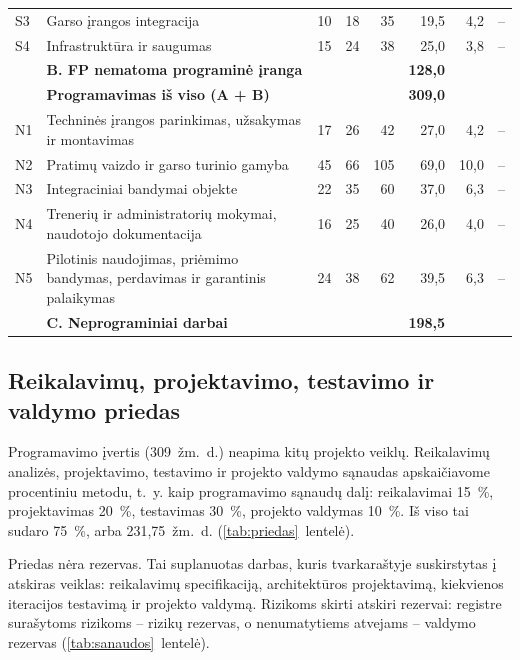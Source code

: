 \begin{table}[H]
\begin{tabularx}{\textwidth}{@{}l>{\raggedright\arraybackslash}Xrrrrrr@{}}
    S3 & Garso įrangos integracija & 10 & 18 & 35 & 19,5 & 4,2 & -- \\
    S4 & Infrastruktūra ir saugumas & 15 & 24 & 38 & 25,0 & 3,8 & -- \\
    \midrule
    & \textbf{B. FP nematoma programinė įranga} & & & & \textbf{128,0} & & \\
    & \textbf{Programavimas iš viso (A + B)} & & & & \textbf{309,0} & & \\
    \midrule
    N1 & Techninės įrangos parinkimas, užsakymas ir montavimas & 17 & 26 & 42 & 27,0 & 4,2 & -- \\
    N2 & Pratimų vaizdo ir garso turinio gamyba & 45 & 66 & 105 & 69,0 & 10,0 & -- \\
    N3 & Integraciniai bandymai objekte & 22 & 35 & 60 & 37,0 & 6,3 & -- \\
    N4 & Trenerių ir administratorių mokymai, naudotojo dokumentacija & 16 & 25 & 40 & 26,0 & 4,0 & -- \\
    N5 & Pilotinis naudojimas, priėmimo bandymas, perdavimas ir garantinis palaikymas & 24 & 38 & 62 & 39,5 & 6,3 & -- \\
    \midrule
    & \textbf{C. Neprograminiai darbai} & & & & \textbf{198,5} & & \\
    \bottomrule
  \end{tabularx}
\end{table}

\subsection{Reikalavimų, projektavimo, testavimo ir valdymo priedas}

Programavimo įvertis (309~žm.~d.) neapima kitų projekto veiklų. Reikalavimų
analizės, projektavimo, testavimo ir projekto valdymo sąnaudas apskaičiavome
procentiniu metodu, t.~y. kaip programavimo sąnaudų dalį: reikalavimai
15~\%, projektavimas 20~\%, testavimas 30~\%, projekto valdymas 10~\%. Iš viso
tai sudaro 75~\%, arba 231,75~žm.~d. (\ref{tab:priedas}~lentelė).

Priedas nėra rezervas. Tai suplanuotas darbas, kuris tvarkaraštyje suskirstytas į
atskiras veiklas: reikalavimų specifikaciją, architektūros projektavimą,
kiekvienos iteracijos testavimą ir projekto valdymą. Rizikoms skirti
atskiri rezervai: registre surašytoms rizikoms – rizikų rezervas, o
nenumatytiems atvejams – valdymo rezervas (\ref{tab:sanaudos}~lentelė).


